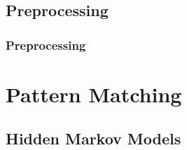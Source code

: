 \documentclass{beamer}
\newcommand{\linespace}{\vskip 0.25cm}
\begin{document}
\subsection{Preprocessing}

\begin{frame}
	\frametitle{Preprocessing}
	
%	
%	
%	
%	
%	
%	
\end{frame}

%	
%				


\section[Pattern Matching]{Pattern Matching}

\subsection{Hidden Markov Models}
\end{document}
